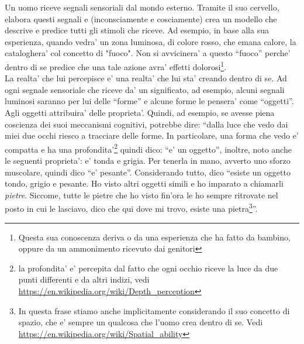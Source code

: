 Un uomo riceve segnali sensoriali dal mondo esterno. Tramite il suo cervello, elabora questi segnali e (inconsciamente e cosciamente) crea un modello che descrive e predice tutti gli stimoli che riceve. Ad esempio, in base alla sua esperienza, quando vedra' un zona luminosa, di colore rosso, che emana calore, la cataloghera' col concetto di "fuoco". Non si avvicinera' a questo ``fuoco'' perche' dentro di se predice che una tale azione avra' effetti dolorosi\footnote{Questa sua conoscenza deriva o da una esperienza che ha fatto da bambino, oppure da un ammonimento ricevuto dai genitori}.\\
La realta' che lui percepisce e' una realta' che lui sta' creando dentro di se. Ad ogni segnale sensoriale che riceve da' un significato, ad esempio, alcuni segnali luminosi saranno per lui delle ``forme'' e alcune forme le pensera' come ``oggetti''. Agli oggetti attribuira' delle proprieta'.  Quindi, ad esempio, se avesse piena coscienza dei suoi meccanismi cognitivi, potrebbe dire: ``dalla luce che vedo dai miei due occhi riesco a tracciare delle forme. In particolare, una forma che vedo e' compatta e ha una profondita'\footnote{la profondita' e' percepita dal fatto che ogni occhio riceve la luce da due punti differenti e da altri indizi, vedi \url{https://en.wikipedia.org/wiki/Depth\_perception}} quindi dico: ``e' un oggetto'', inoltre, noto anche le seguenti proprieta': e' tonda e grigia. Per tenerla in mano, avverto uno sforzo muscolare, quindi dico ``e' pesante''. Considerando tutto, dico ``esiste un oggetto tondo, grigio e pesante. Ho visto altri oggetti simili e ho imparato a chiamarli \emph{pietre}. Siccome, tutte le pietre che ho visto fin'ora le ho sempre ritrovate nel posto in cui le lasciavo, dico che qui dove mi trovo, esiste una pietra\footnote{In questa frase stiamo anche implicitamente considerando il suo concetto di spazio, che e' sempre un qualcosa che l'uomo crea dentro di se. Vedi \url{https://en.wikipedia.org/wiki/Spatial\_ability}}''.\\




